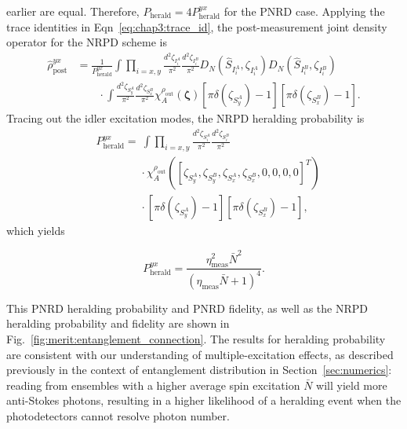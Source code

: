 \documentclass[aps,twocolumn,secnumarabic,amsmath,amssymb,pra,groupedaddress,
showpacs, showkeys]{revtex4-1}
\newcommand{\pna}[1]{\left(#1\right)}
\newcommand{\pnb}[1]{\left[#1\right]}
\newcommand{\eqn}[1]{
\begin{equation}
	#1
\end{equation}
}
\begin{document}
earlier are equal. Therefore, $P_{\textrm{herald}}=4P_{\textrm{herald}}^{yx}$
for the PNRD case. Applying the trace identities in
Eqn~\ref{eq:chap3:trace_id}, the post-measurement joint density operator for
the NRPD scheme is
\begin{align}
\hat{\rho}_{\textrm{post}}^{yx}& =
\frac{1}{P_{\textrm{herald}}^{yx}}\int \prod_{i=x,y}
\frac{d^2 \zeta_{I_i^A}}{\pi^2} 
\frac{d^2 \zeta_{I_i^B}}{\pi^2} 
D_N\pna{\hat{S}_{I_i^A},\zeta_{I_i^A}} 
D_N\pna{\hat{S}_{I_i^B},\zeta_{I_i^B}}  \nonumber \\
& \qquad \cdot \int 
\frac{d^2 \zeta_{S_y^A}}{\pi^2} 
\frac{d^2 \zeta_{S_x^B}}{\pi^2}
\chi_A^{\rho_{\textrm{out}}}\pna{\bm{\zeta}} 
\pnb{\pi\delta\pna{\zeta_{S_y^A}}-1}\pnb{\pi\delta\pna{\zeta_{S_x^B}}-1}.
\end{align}
Tracing out the idler excitation modes, the NRPD heralding probability is 
\begin{align}
& P_{\textrm{herald}}^{yx} = \nonumber \ \int 
\prod_{i=x,y}
\frac{d^2 \zeta_{S_i^A}}{\pi^2} 
\frac{d^2 \zeta_{S_i^B}}{\pi^2} \nonumber \\ 
& \qquad \qquad \cdot
\chi_A^{\rho_{\textrm{out}}}\pna{\pnb{\zeta_{S_y^A},\zeta_{S_y^B},\zeta_{S_x^A},\zeta_{S_x^B},0,0,0,0}^T}
\nonumber \\
& \qquad \qquad \cdot 
\pnb{\pi\delta\pna{\zeta_{S_y^A}}-1}\pnb{\pi\delta\pna{\zeta_{S_x^B}}-1},
\end{align}
which yields
\eqn{
P_{\textrm{herald}}^{yx} = \frac{\eta ^2_{\textrm{meas}} \bar{N}^2}{(\eta_{\textrm{meas}}  \bar{N}+1)^4}.
}
This PNRD heralding probability and PNRD fidelity, as well as the NRPD
heralding probability and fidelity are shown in
Fig.~\ref{fig:merit:entanglement_connection}. The results for heralding
probability are consistent with our understanding of multiple-excitation
effects, as described previously in the context of entanglement distribution in
Section~\ref{sec:numerics}: reading from ensembles with a higher average spin
excitation $\bar{N}$ will yield more anti-Stokes photons, resulting in a higher
likelihood of a heralding event when the photodetectors cannot resolve photon
number.
\end{document}
